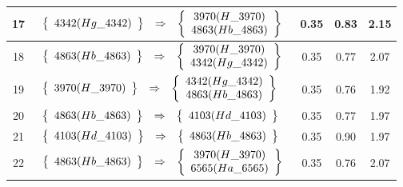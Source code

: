 \begin{longtable}{| c | l | c | c | c |}
17 & $\begin{array}{c c c}\left\{\begin{array}{c}4342 (Hg\_4342)\end{array}\right\} & \Rightarrow & \left\{\begin{array}{c}3970 (H\_3970) \\ 4863 (Hb\_4863)\end{array}\right\}\end{array}$ & 0.35 & 0.83 & 2.15 \\ \hline
18 & $\begin{array}{c c c}\left\{\begin{array}{c}4863 (Hb\_4863)\end{array}\right\} & \Rightarrow & \left\{\begin{array}{c}3970 (H\_3970) \\ 4342 (Hg\_4342)\end{array}\right\}\end{array}$ & 0.35 & 0.77 & 2.07 \\ \hline
19 & $\begin{array}{c c c}\left\{\begin{array}{c}3970 (H\_3970)\end{array}\right\} & \Rightarrow & \left\{\begin{array}{c}4342 (Hg\_4342) \\ 4863 (Hb\_4863)\end{array}\right\}\end{array}$ & 0.35 & 0.76 & 1.92 \\ \hline
20 & $\begin{array}{c c c}\left\{\begin{array}{c}4863 (Hb\_4863)\end{array}\right\} & \Rightarrow & \left\{\begin{array}{c}4103 (Hd\_4103)\end{array}\right\}\end{array}$ & 0.35 & 0.77 & 1.97 \\ \hline
21 & $\begin{array}{c c c}\left\{\begin{array}{c}4103 (Hd\_4103)\end{array}\right\} & \Rightarrow & \left\{\begin{array}{c}4863 (Hb\_4863)\end{array}\right\}\end{array}$ & 0.35 & 0.90 & 1.97 \\ \hline
22 & $\begin{array}{c c c}\left\{\begin{array}{c}4863 (Hb\_4863)\end{array}\right\} & \Rightarrow & \left\{\begin{array}{c}3970 (H\_3970) \\ 6565 (Ha\_6565)\end{array}\right\}\end{array}$ & 0.35 & 0.76 & 2.07 \\ \hline

\end{longtable}
